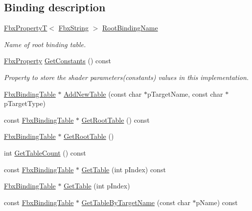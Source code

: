 \subsection*{Binding description}
\begin{DoxyCompactItemize}
\item 
\hyperlink{class_fbx_property_t}{Fbx\+PropertyT}$<$ \hyperlink{class_fbx_string}{Fbx\+String} $>$ \hyperlink{class_fbx_implementation_a80df4effca2446b00f8925634c3d26aa}{Root\+Binding\+Name}
\begin{DoxyCompactList}\small\item\em Name of root binding table. \end{DoxyCompactList}\item 
\hyperlink{class_fbx_property}{Fbx\+Property} \hyperlink{class_fbx_implementation_a6b8a6fd6e27dbd2707dc8264b24ab5c9}{Get\+Constants} () const
\begin{DoxyCompactList}\small\item\em Property to store the shader parameters(constants) values in this implementation. \end{DoxyCompactList}\item 
\hyperlink{class_fbx_binding_table}{Fbx\+Binding\+Table} $\ast$ \hyperlink{class_fbx_implementation_af84aa8a3ee2de64fb485fec5079495c1}{Add\+New\+Table} (const char $\ast$p\+Target\+Name, const char $\ast$p\+Target\+Type)
\item 
const \hyperlink{class_fbx_binding_table}{Fbx\+Binding\+Table} $\ast$ \hyperlink{class_fbx_implementation_a627e85260da5dd853a7a0a0660229254}{Get\+Root\+Table} () const
\item 
\hyperlink{class_fbx_binding_table}{Fbx\+Binding\+Table} $\ast$ \hyperlink{class_fbx_implementation_afc289e50527a2dfa6c977080721a8217}{Get\+Root\+Table} ()
\item 
int \hyperlink{class_fbx_implementation_a36f67aeee13d4cc5d1523b9c36a44a50}{Get\+Table\+Count} () const
\item 
const \hyperlink{class_fbx_binding_table}{Fbx\+Binding\+Table} $\ast$ \hyperlink{class_fbx_implementation_a0cbdb7d46ba4a42cdea6336ef859cc0a}{Get\+Table} (int p\+Index) const
\item 
\hyperlink{class_fbx_binding_table}{Fbx\+Binding\+Table} $\ast$ \hyperlink{class_fbx_implementation_a854d69db6f3a3d262f5b61ca6bed1817}{Get\+Table} (int p\+Index)
\item 
const \hyperlink{class_fbx_binding_table}{Fbx\+Binding\+Table} $\ast$ \hyperlink{class_fbx_implementation_a45821c1d329404af513665d9809bab69}{Get\+Table\+By\+Target\+Name} (const char $\ast$p\+Name) const

\end{DoxyCompactItemize}
